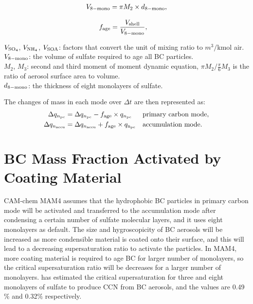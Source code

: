 \documentclass[12pt, fullpage]{uiucthesis2009}
\begin{document}
	\begin{align}
	\begin{split}
	V_{\rm{8-mono}} = \pi M_2 \times d_{\rm{8-mono}},
	\end{split}
	\end{align}
	
	\begin{align}
	f_{\rm{age}} &= \frac{V_{\rm{shell}}}{V_{\rm{8-mono}}},  
	\end{align}
	
	\begin{flushleft}
		$V_{\rm{SO_4}}$, $V_{\rm{NH_4}}$, $V_{\rm{SOA}}$: factors that convert the unit of mixing ratio to $m^3/$kmol air. \\
		$V_{\rm{8-mono}}$: the volume of sulfate required to age all BC particles. \\
		$M_2$, $M_3$: second and third moment of  moment dynamic equation, $\pi M_2/ \frac{\pi}{6}M_3$ is the ratio of aerosol surface area to volume. \\
		$d_{\rm{8-mono}}$: the thickness of eight monolayers of sulfate.
	\end{flushleft}
	
	The changes of mass in each mode over $\Delta t$ are then represented as:
	\begin{align}
	\Delta q_{n_{\rm{pc}}} &= \Delta q_{n_{\rm{pc}}} - f_{\rm{age}} \times q_{n_{\rm{pc}}}  &&\text{primary carbon mode}, \\
	\Delta q_{n_{\rm{accu}}} &= \Delta q_{n_{\rm{accu}}} + f_{\rm{age}} \times q_{\rm{n_{\rm{pc}}}}  &&\text{accumulation mode}.
	\end{align}
	
		\section{BC Mass Fraction Activated by Coating Material}
		CAM-chem MAM4 assumes that the hydrophobic BC particles in  primary carbon mode will be activated and transferred to the accumulation mode after condensing a certain number of sulfate molecular layers, and it uses eight monolayers as default. The size and hygroscopicity of BC aerosols will be increased as more condensible material is coated onto their surface, and this will lead to a decreasing supersaturation ratio to activate the particles. In MAM4, more coating material is required to age BC for larger number of monolayers, so the critical supersaturation ratio will be decreases for a larger number of monolayers. \citet{Liu2012} has estimated the critical supersaturation for three and eight monolayers of sulfate to produce CCN from BC aerosols, and the values are 0.49$\%$ and 0.32$\%$ respectively. 
		
\end{document}
